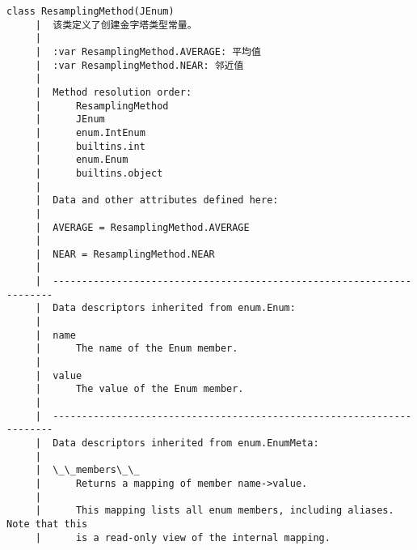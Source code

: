 \documentclass[11pt]{article}
\begin{document}
\begin{Verbatim}[commandchars=\\\{\}]
    class ResamplingMethod(JEnum)
     |  该类定义了创建金字塔类型常量。
     |  
     |  :var ResamplingMethod.AVERAGE: 平均值
     |  :var ResamplingMethod.NEAR: 邻近值
     |  
     |  Method resolution order:
     |      ResamplingMethod
     |      JEnum
     |      enum.IntEnum
     |      builtins.int
     |      enum.Enum
     |      builtins.object
     |  
     |  Data and other attributes defined here:
     |  
     |  AVERAGE = ResamplingMethod.AVERAGE
     |  
     |  NEAR = ResamplingMethod.NEAR
     |  
     |  ----------------------------------------------------------------------
     |  Data descriptors inherited from enum.Enum:
     |  
     |  name
     |      The name of the Enum member.
     |  
     |  value
     |      The value of the Enum member.
     |  
     |  ----------------------------------------------------------------------
     |  Data descriptors inherited from enum.EnumMeta:
     |  
     |  \_\_members\_\_
     |      Returns a mapping of member name->value.
     |      
     |      This mapping lists all enum members, including aliases. Note that this
     |      is a read-only view of the internal mapping.
    

\end{Verbatim}
\end{document}
